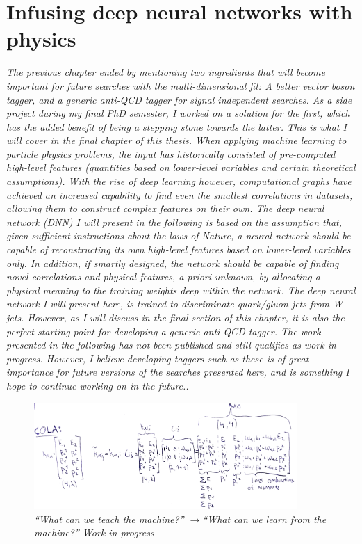 \vspace*{\fill}
\section{Infusing deep neural networks with physics}
\label{sec:lolaintro}
\begin{centering}
\textit{
The previous chapter ended by mentioning two ingredients that will become important for future searches with the multi-dimensional fit: A better vector boson tagger, and a generic anti-QCD tagger for signal independent searches. As a side project during my final PhD semester, I worked on a solution for the first, which has the added benefit of being a stepping stone towards the latter. This is what I will cover in the final chapter of this thesis.
\newline
\newline
When applying machine learning to particle physics problems, the input has historically consisted of pre-computed high-level features (quantities based on lower-level variables and certain theoretical assumptions).
With the rise of deep learning however, computational graphs have achieved an increased capability to find even the smallest correlations in datasets, allowing them to construct complex features on their own. The deep neural network (DNN) I will present in the following is based on the assumption that, given sufficient instructions about the laws of Nature, a neural network should be capable of reconstructing its own high-level features based on lower-level variables only. In addition, if smartly designed, the network should be capable of finding novel correlations and physical features, a-priori unknown, by allocating a physical meaning to the training weights deep within the network. The deep neural network I will present here, is trained to discriminate quark/gluon jets from W-jets. However, as I will discuss in the final section of this chapter, it is also the perfect starting point for developing a generic anti-QCD tagger.
\newline
\newline
The work presented in the following has not been published and still qualifies as work in progress. However, I believe developing taggers such as these is of great importance for future versions of the searches presented here, and is something I hope to continue working on in the future..
}
\begin{figure}[b!] 
    \centering
    \includegraphics[width=10cm]{figures/vtagging/misc/cola.png}
    \vspace*{10mm}
    \caption*{\footnotesize{\textit{ ``What can we teach the machine?'' $\rightarrow$``What can we learn from the machine?'' Work in progress}}}
\end{figure}
\end{centering}
